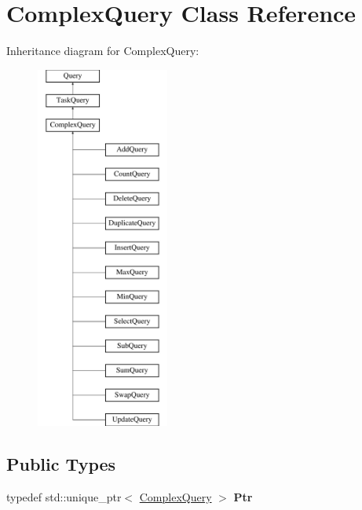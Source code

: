 \hypertarget{class_complex_query}{}\section{Complex\+Query Class Reference}
\label{class_complex_query}
Inheritance diagram for Complex\+Query\+:\begin{figure}[H]
\begin{center}
\leavevmode
\includegraphics[height=12.000000cm]{class_complex_query}
\end{center}
\end{figure}
\subsection*{Public Types}
\begin{DoxyCompactItemize}
\item 
\mbox{\label{class_complex_query_a713f4580157fdd4a058b891599d5347e}} 
typedef std\+::unique\+\_\+ptr$<$ \hyperlink{class_complex_query}{Complex\+Query} $>$ {\bfseries Ptr}
\end{DoxyCompactItemize}
